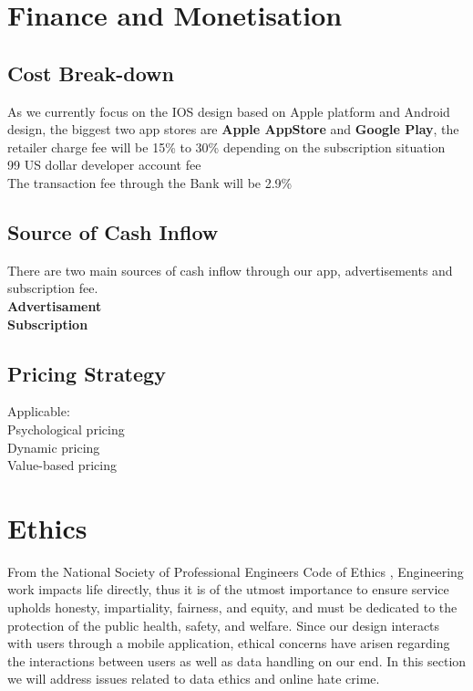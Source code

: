 \section{Finance and Monetisation}

\subsection{Cost Break-down}

As we currently focus on the IOS design based on Apple platform and Android design, the biggest two app stores are \textbf{Apple AppStore} and \textbf{Google Play}, the retailer charge fee will be 15\% to 30\% depending on the subscription situation
\\ 99 US dollar developer account fee 
\\ The transaction fee through the Bank will be 2.9\%

\subsection{Source of Cash Inflow}
There are two main sources of cash inflow through our app, advertisements and subscription fee.
\\ \textbf{Advertisament}
\\ \textbf{Subscription}


\subsection{Pricing Strategy}
Applicable:
\\Psychological pricing
\\Dynamic pricing
\\Value-based pricing





\section{Ethics}
From the National Society of Professional Engineers Code of Ethics \cite{codeofethics}, Engineering
work impacts life directly, thus it is of the utmost importance to ensure service 
upholds honesty, impartiality, fairness, and equity, and must be dedicated to the protection of
the public health, safety, and welfare. Since our design interacts with users
through a mobile application, ethical concerns have arisen regarding the interactions between users 
as well as data handling on our end. In this section we will address issues related to data ethics 
and online hate crime.

